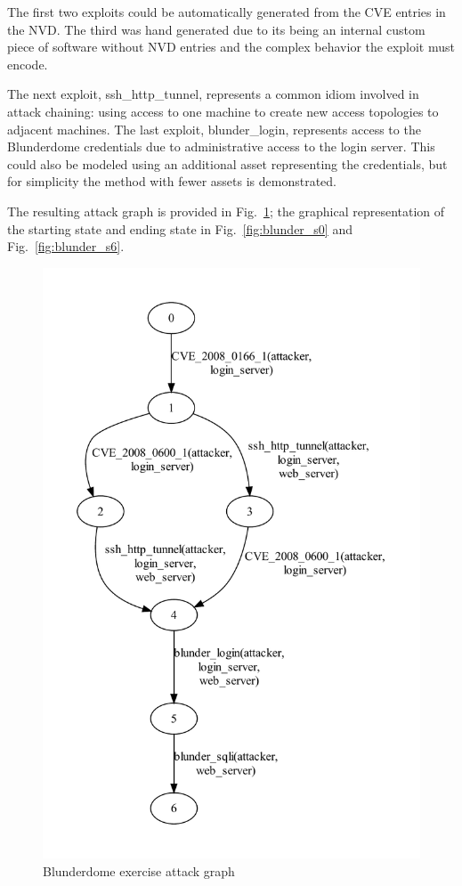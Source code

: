 The first two exploits could be automatically generated from the CVE entries
in the NVD. The third was hand generated due to its being an internal custom 
piece of software without NVD entries and the complex behavior the exploit must
encode.

The next exploit, ssh\_http\_tunnel, represents a common idiom involved in
attack chaining: using access to one machine to create new access topologies
to adjacent machines. The last exploit, blunder\_login, represents access to
the Blunderdome credentials due to administrative access to the login
server. This could also be modeled using an additional asset representing the
credentials, but for simplicity the method with fewer assets is demonstrated.

The resulting attack graph is provided in Fig.~\ref{fig:blunder_ag}; the
graphical representation of the starting state and ending state in 
Fig.~\ref{fig:blunder_s0} and Fig.~\ref{fig:blunder_s6}.

\begin{figure}
\includegraphics[width=5in]{ag_blunderdome/ag_depth5}
\caption{Blunderdome exercise attack graph}
\label{fig:blunder_ag}
\end{figure}

